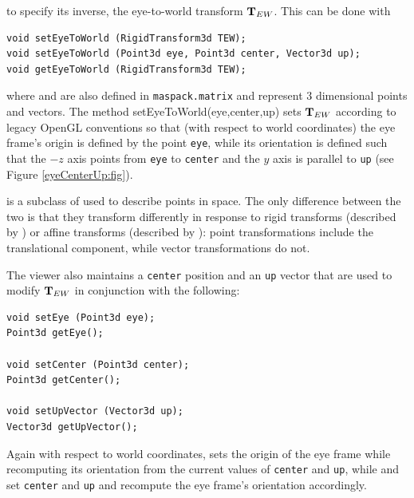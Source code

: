 to specify its inverse, the eye-to-world transform ${\bf T}_{EW}$.
This can be done with
%
\begin{lstlisting}[]
void setEyeToWorld (RigidTransform3d TEW);
void setEyeToWorld (Point3d eye, Point3d center, Vector3d up);
void getEyeToWorld (RigidTransform3d TEW);
\end{lstlisting}
%
where 
 and
 are also defined in 
{\tt maspack.matrix} and represent 3 dimensional points and vectors.
The method
%
{setEyeToWorld(eye,center,up)} sets ${\bf T}_{EW}$ according to legacy
OpenGL conventions so that (with respect to world coordinates) the eye
frame's origin is defined by the point {\tt eye}, while its
orientation is defined such that the $-z$ axis points from {\tt eye}
to {\tt center} and the $y$ axis is parallel to {\tt up} (see Figure
\ref{eyeCenterUp:fig}).

\begin{sideblock}
 is a subclass of
 used to describe points in
space. The only difference between the two is that they transform
differently in response to rigid transforms (described by
) or affine transforms
(described by ): point
transformations include the translational component, while vector
transformations do not.
\end{sideblock}

The viewer also maintains a {\tt center} position and an {\tt up}
vector that are used to modify ${\bf T}_{EW}$ in conjunction
with the following:
%
\begin{lstlisting}[]
void setEye (Point3d eye);
Point3d getEye();

void setCenter (Point3d center);
Point3d getCenter();

void setUpVector (Vector3d up);
Vector3d getUpVector();
\end{lstlisting}
%
Again with respect to world coordinates,
sets the origin of the eye frame while recomputing its orientation
from the current values of {\tt center} and {\tt up}, while
and
set {\tt center} and {\tt up} and recompute the eye frame's
orientation accordingly.

